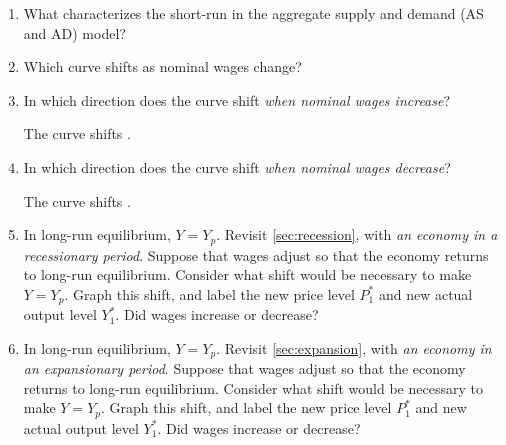 \documentclass{assignment}
\begin{document}
\begin{enumerate}

\item What characterizes the short-run in the aggregate supply and demand (AS and AD) model?

\vfill

\item Which curve shifts as nominal wages change?

\vfill

\item In which direction does the curve shift \emph{when nominal wages increase}?

\vspace{1.0\baselineskip}
The \underline{\hspace{2in}} curve shifts \underline{\hspace{2in}}.
\vspace{1.0\baselineskip}

\item In which direction does the curve shift \emph{when nominal wages decrease}?

\vspace{1.0\baselineskip}
The \underline{\hspace{2in}} curve shifts \underline{\hspace{2in}}.
\vspace{1.0\baselineskip}

\item In long-run equilibrium, $Y=Y_p$. Revisit \cref{sec:recession}, with \emph{an economy in a recessionary period}. Suppose that wages adjust so that the economy returns to long-run equilibrium. Consider what shift would be necessary to make $Y=Y_p$. Graph this shift, and label the new price level $P^*_1$ and new actual output level $Y^*_1$. Did wages increase or decrease?

\vfill

\item In long-run equilibrium, $Y=Y_p$. Revisit \cref{sec:expansion}, with \emph{an economy in an expansionary period}. Suppose that wages adjust so that the economy returns to long-run equilibrium. Consider what shift would be necessary to make $Y=Y_p$. Graph this shift, and label the new price level $P^*_1$ and new actual output level $Y^*_1$. Did wages increase or decrease?

\vfill

\vspace{-2\baselineskip}
\clearpage

\end{enumerate}
\end{document}
